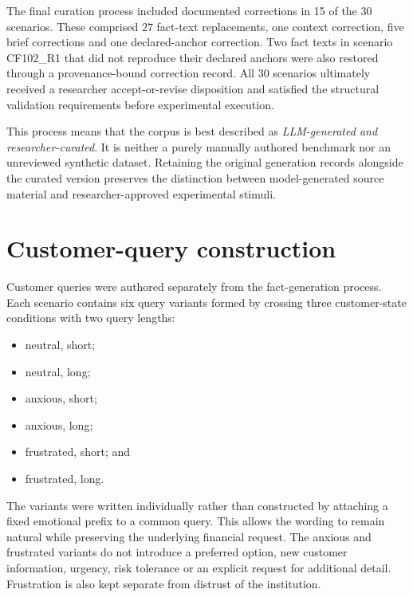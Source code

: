 \documentclass[12pt,a4paper,oneside]{report}
\begin{document}
The final curation process included documented corrections in 15 of the 30 scenarios. These comprised 27 fact-text replacements, one context correction, five brief corrections and one declared-anchor correction. Two fact texts in scenario CF102\_R1 that did not reproduce their declared anchors were also restored through a provenance-bound correction record. All 30 scenarios ultimately received a researcher accept-or-revise disposition and satisfied the structural validation requirements before experimental execution.

This process means that the corpus is best described as \emph{LLM-generated and researcher-curated}. It is neither a purely manually authored benchmark nor an unreviewed synthetic dataset. Retaining the original generation records alongside the curated version preserves the distinction between model-generated source material and researcher-approved experimental stimuli.

\section{Customer-query construction}

Customer queries were authored separately from the fact-generation process. Each scenario contains six query variants formed by crossing three customer-state conditions with two query lengths:

\begin{itemize}[leftmargin=1.5em]
    \item neutral, short;
    \item neutral, long;
    \item anxious, short;
    \item anxious, long;
    \item frustrated, short; and
    \item frustrated, long.
\end{itemize}

The variants were written individually rather than constructed by attaching a fixed emotional prefix to a common query. This allows the wording to remain natural while preserving the underlying financial request. The anxious and frustrated variants do not introduce a preferred option, new customer information, urgency, risk tolerance or an explicit request for additional detail. Frustration is also kept separate from distrust of the institution.
\end{document}
